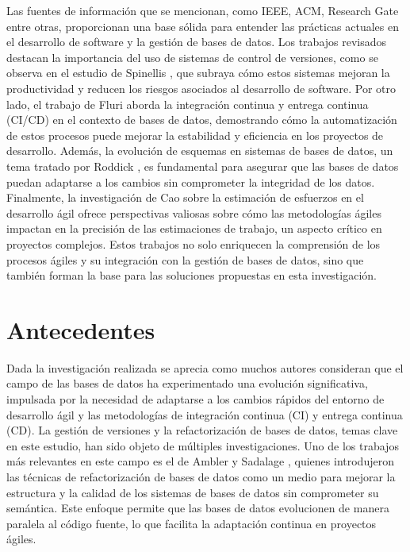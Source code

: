 \documentclass{IEEEtran}
\begin{document}
Las fuentes de información que se mencionan, como IEEE, ACM, Research Gate entre otras, proporcionan una base sólida para entender las prácticas actuales en el desarrollo de software y la gestión de bases de datos. Los trabajos revisados destacan la importancia del uso de sistemas de control de versiones, como se observa en el estudio de Spinellis \cite{spinellis2005version}, que subraya cómo estos sistemas mejoran la productividad y reducen los riesgos asociados al desarrollo de software. Por otro lado, el trabajo de Fluri \cite{fluri2023measuring} aborda la integración continua y entrega continua (CI/CD) en el contexto de bases de datos, demostrando cómo la automatización de estos procesos puede mejorar la estabilidad y eficiencia en los proyectos de desarrollo. Además, la evolución de esquemas en sistemas de bases de datos, un tema tratado por Roddick \cite{roddick1992schema}, es fundamental para asegurar que las bases de datos puedan adaptarse a los cambios sin comprometer la integridad de los datos. Finalmente, la investigación de Cao \cite{cao2022estimating} sobre la estimación de esfuerzos en el desarrollo ágil ofrece perspectivas valiosas sobre cómo las metodologías ágiles impactan en la precisión de las estimaciones de trabajo, un aspecto crítico en proyectos complejos. Estos trabajos no solo enriquecen la comprensión de los procesos ágiles y su integración con la gestión de bases de datos, sino que también forman la base para las soluciones propuestas en esta investigación.


\section{Antecedentes}

Dada la investigación realizada se aprecia como muchos autores consideran que el campo de las bases de datos ha experimentado una evolución significativa, impulsada por la necesidad de adaptarse a los cambios rápidos del entorno de desarrollo ágil y las metodologías de integración continua (CI) y entrega continua (CD). La gestión de versiones y la refactorización de bases de datos, temas clave en este estudio, han sido objeto de múltiples investigaciones. Uno de los trabajos más relevantes en este campo es el de Ambler y Sadalage \cite{ambler2006refactoring}, quienes introdujeron las técnicas de refactorización de bases de datos como un medio para mejorar la estructura y la calidad de los sistemas de bases de datos sin comprometer su semántica. Este enfoque permite que las bases de datos evolucionen de manera paralela al código fuente, lo que facilita la adaptación continua en proyectos ágiles. 
\end{document}
